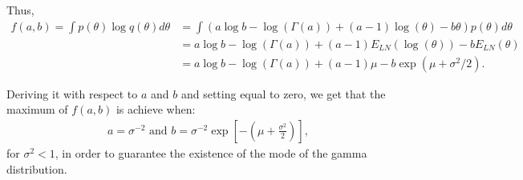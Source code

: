 \documentclass[12pt,a4paper]{article}\usepackage[]{graphicx}\usepackage[]{color}\usepackage{subfigure}
\begin{document}
Thus,
\begin{align*}
f(a,b) = \int{p(\theta)\log{q(\theta)}d\theta} &= \int{\left(a\log b - \log(\Gamma(a))+(a-1)\log(\theta)-b\theta\right)p(\theta)d\theta}\\
& = a\log b - \log(\Gamma(a)) + (a-1)E_{LN}(\log(\theta))-b E_{LN}(\theta)\\
& =  a\log b - \log(\Gamma(a)) + (a-1)\mu-b \exp\left(\mu+\sigma^2/2\right).
\end{align*} 

Deriving it with respect to $a$ and $b$ and setting equal to zero, we get that the maximum of $f(a,b)$ is achieve when:
\begin{align*}
a = \sigma^{-2} \mbox{ and } b = \sigma^{-2}\exp\left[-\left(\mu+\frac{\sigma^2}{2}\right)\right],
\end{align*}
for $\sigma^2<1$, in order to guarantee the existence of the mode of the gamma distribution.

\end{document}
